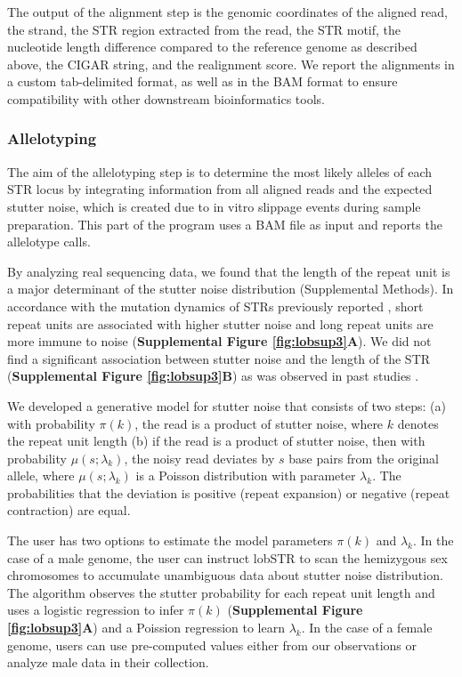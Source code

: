 The output of the alignment step is the genomic coordinates of the aligned read, the strand, the STR region extracted from the read, the STR motif, the nucleotide length difference compared to the reference genome as described above, the CIGAR string, and the realignment score. We report the alignments in a custom tab-delimited format, as well as in the BAM format \cite{LiZhaoLinEtAl2009} to ensure compatibility with other downstream bioinformatics tools.

\subsubsection{Allelotyping}
The aim of the allelotyping step is to determine the most likely alleles of each STR locus by integrating information from all aligned reads and the expected stutter noise, which is created due to in vitro slippage events during sample preparation. This part of the program uses a BAM file as input and reports the allelotype calls.

By analyzing real sequencing data, we found that the length of the repeat unit is a major determinant of the stutter noise distribution (Supplemental Methods). In accordance with the mutation dynamics of STRs previously reported \cite{Ellegren2004}, short repeat units are associated with higher stutter noise and long repeat units are more immune to noise (\textbf{Supplemental Figure \ref{fig:lobsup3}A}). We did not find a significant association between stutter noise and the length of the STR (\textbf{Supplemental Figure \ref{fig:lobsup3}B}) as was observed in past studies \cite{HaugeLitt1993}.

We developed a generative model for stutter noise that consists of two steps: (a) with probability $\pi(k)$, the read is a product of stutter noise, where $k$ denotes the repeat unit length (b) if the read is a product of stutter noise, then with probability $\mu(s; \lambda_k)$, the noisy read deviates by $s$ base pairs from the original allele, where $\mu(s; \lambda_k)$ is a Poisson distribution with parameter $\lambda_k$. The probabilities that the deviation is positive (repeat expansion) or negative (repeat contraction) are equal. 

The user has two options to estimate the model parameters $\pi(k)$ and $\lambda_k$. In the case of a male genome, the user can instruct lobSTR to scan the hemizygous sex chromosomes to accumulate unambiguous data about stutter noise distribution. The algorithm observes the stutter probability for each repeat unit length and uses a logistic regression to infer $\pi(k)$ (\textbf{Supplemental Figure \ref{fig:lobsup3}A}) and a Poission regression to learn $\lambda_k$. In the case of a female genome, users can use pre-computed values either from our observations or analyze male data in their collection. 

